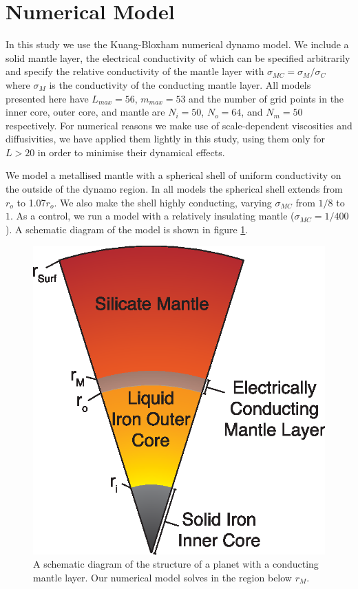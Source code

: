 \section{Numerical Model}
In this study we use the Kuang-Bloxham numerical dynamo model. We include a solid mantle layer, the electrical conductivity of which can be specified arbitrarily and specify the relative conductivity of the mantle layer with $\sigma_{MC}=\sigma_{M}/\sigma_{C}$ where $\sigma_{M}$ is the conductivity of the conducting mantle layer. All models presented here have $L_{max}=56$, $m_{max}=53$ and the number of grid points in the inner core, outer core, and mantle are $N_{i}=50$, $N_{o}=64$, and $N_{m}=50$ respectively. For numerical reasons we make use of scale-dependent viscosities and diffusivities, we have applied them lightly in this study, using them only for $L>20$ in order to minimise their dynamical effects.

We model a metallised mantle with a spherical shell of uniform conductivity on the outside of the dynamo region. In all models the spherical shell extends from $r_{o}$ to 1.07$r_{o}$. We also make the shell highly conducting, varying $\sigma_{MC}$ from $1/8$ to $1$. As a control, we run a model with a relatively insulating mantle ($\sigma_{MC}=1/400$). A schematic diagram of the model is shown in figure \ref{fig:structure}.
\begin{figure}
\centering
\noindent\includegraphics[width=.6\linewidth]{Chapter3/Figures/f1.eps}
\caption{A schematic diagram of the structure of a planet with a conducting mantle layer. Our numerical model solves in the region below $r_{M}$.}
\label{fig:structure}
\end{figure}

